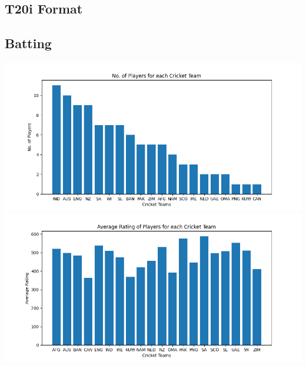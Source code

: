 \documentclass{article}
\begin{document}
    \begin{normalsize}

        \section{T20i Format}\label{sec:t20i-format}
            \subsection{Batting}\label{subsec:batting1}
                \includegraphics[scale=0.7]{t20i_batting-1}
                \vspace{1em}\\
                \includegraphics[scale=0.7]{t20i_batting-2}

\end{normalsize}
\end{document}
